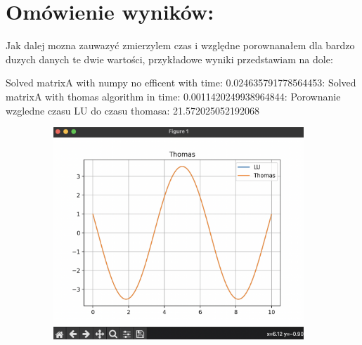 \documentclass[12pt]{article}
\begin{document}
\section{Omówienie wyników:}
Jak dalej mozna zauwazyć zmierzylem czas i względne porownanałem dla bardzo duzych danych te dwie wartości, przykładowe wyniki przedstawiam na dole:
\begin{center}
    Solved matrixA with numpy no efficent with time: 0.024635791778564453:
    \newline\newline
    Solved matrixA with thomas algorithm in time: 0.0011420249938964844:
    \newline\newline
    Porownanie wzgledne czasu LU do czasu thomasa: 21.572025052192068
\end{center}
\includegraphics[width=13cm,height=8cm, keepaspectratio]{wykres}
\end{document}
